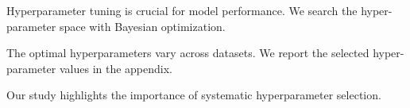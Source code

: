 Hyperparameter tuning is crucial for model performance. We search the hyper-parameter space with Bayesian optimization.

The optimal hyperparameters vary across datasets. We report the selected hyper-parameter values in the appendix.

Our study highlights the importance of systematic hyperparameter selection.
